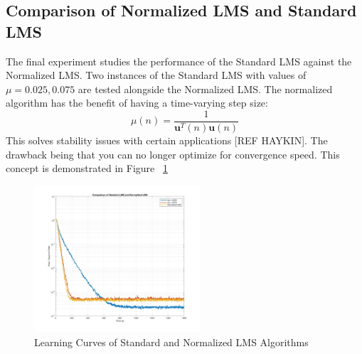 \documentclass[journal]{IEEEtran}
\begin{document}
\subsection{Comparison of Normalized LMS and Standard LMS}
The final experiment studies the performance of the Standard LMS against the Normalized LMS. Two instances of the
Standard LMS with values of $\mu = 0.025, 0.075$ are tested alongside the Normalized LMS. The normalized algorithm has the
benefit of having a time-varying step size:
$$\mu(n) = \dfrac{1}{\boldsymbol{u}^T(n)\boldsymbol{u}(n)}$$
This solves stability issues with certain applications [REF HAYKIN]. The drawback being that you can no longer
optimize for convergence speed. This concept is demonstrated in Figure ~\ref{fig:normalizedlms}
\begin{figure}[H]
  \centering
  \captionsetup{justification=centering,font = small}
  \includegraphics[width=0.55\textwidth, right] {Plots/Project1_Part5.jpg}
  \caption{Learning Curves of Standard and Normalized LMS Algorithms}
    \label{fig:normalizedlms}
\end{figure}

\end{document}

